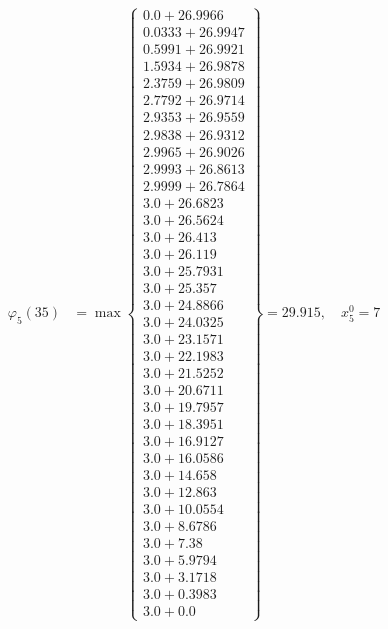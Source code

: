\documentclass{article}
\begin{document}
\begin{align*}
\varphi_{5}(35) &= \max \left\{ \begin{array}{c}
0.0 + 26.9966 \\
 0.0333 + 26.9947 \\
 0.5991 + 26.9921 \\
 1.5934 + 26.9878 \\
 2.3759 + 26.9809 \\
 2.7792 + 26.9714 \\
 2.9353 + 26.9559 \\
 2.9838 + 26.9312 \\
 2.9965 + 26.9026 \\
 2.9993 + 26.8613 \\
 2.9999 + 26.7864 \\
 3.0 + 26.6823 \\
 3.0 + 26.5624 \\
 3.0 + 26.413 \\
 3.0 + 26.119 \\
 3.0 + 25.7931 \\
 3.0 + 25.357 \\
 3.0 + 24.8866 \\
 3.0 + 24.0325 \\
 3.0 + 23.1571 \\
 3.0 + 22.1983 \\
 3.0 + 21.5252 \\
 3.0 + 20.6711 \\
 3.0 + 19.7957 \\
 3.0 + 18.3951 \\
 3.0 + 16.9127 \\
 3.0 + 16.0586 \\
 3.0 + 14.658 \\
 3.0 + 12.863 \\
 3.0 + 10.0554 \\
 3.0 + 8.6786 \\
 3.0 + 7.38 \\
 3.0 + 5.9794 \\
 3.0 + 3.1718 \\
 3.0 + 0.3983 \\
 3.0 + 0.0
\end{array} \right\}=29.915, \quad x_{5}^0=7\\
  

\end{align*}
\end{document}

